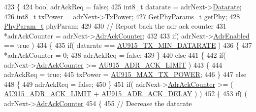 \begin{DoxyCode}
423 \{
424     \textcolor{keywordtype}{bool} adrAckReq = \textcolor{keyword}{false};
425     int8\_t datarate = adrNext->\mbox{\hyperlink{structs_adr_next_params_ae2f6080f3aa0e9485c55513ca56bb24d}{Datarate}};
426     int8\_t txPower = adrNext->\mbox{\hyperlink{structs_adr_next_params_a037b4f849fa8ed4aa1d3c58aef2b28ec}{TxPower}};
427     \mbox{\hyperlink{structs_get_phy_params}{GetPhyParams\_t}} getPhy;
428     \mbox{\hyperlink{unionu_phy_param}{PhyParam\_t}} phyParam;
429 
430     \textcolor{comment}{// Report back the adr ack counter}
431     *adrAckCounter = adrNext->\mbox{\hyperlink{structs_adr_next_params_a24f0356a3491bf07be9ac99ffa33896a}{AdrAckCounter}};
432 
433     \textcolor{keywordflow}{if}( adrNext->\mbox{\hyperlink{structs_adr_next_params_ab3e2fb44577c95786e11aacd56769703}{AdrEnabled}} == \textcolor{keyword}{true} )
434     \{
435         \textcolor{keywordflow}{if}( datarate == \mbox{\hyperlink{group___r_e_g_i_o_n_a_u915_ga3a7bb744191d2b9daaf6637d36d78422}{AU915\_TX\_MIN\_DATARATE}} )
436         \{
437             *adrAckCounter = 0;
438             adrAckReq = \textcolor{keyword}{false};
439         \}
440         \textcolor{keywordflow}{else}
441         \{
442             \textcolor{keywordflow}{if}( adrNext->\mbox{\hyperlink{structs_adr_next_params_a24f0356a3491bf07be9ac99ffa33896a}{AdrAckCounter}} >= \mbox{\hyperlink{group___r_e_g_i_o_n_a_u915_gab5782862067a1d6338da8372a9d484c6}{AU915\_ADR\_ACK\_LIMIT}} )
443             \{
444                 adrAckReq = \textcolor{keyword}{true};
445                 txPower = \mbox{\hyperlink{group___r_e_g_i_o_n_a_u915_ga36808f695e52582b8a6a3ca4b4bf61d4}{AU915\_MAX\_TX\_POWER}};
446             \}
447             \textcolor{keywordflow}{else}
448             \{
449                 adrAckReq = \textcolor{keyword}{false};
450             \}
451             \textcolor{keywordflow}{if}( adrNext->\mbox{\hyperlink{structs_adr_next_params_a24f0356a3491bf07be9ac99ffa33896a}{AdrAckCounter}} >= ( \mbox{\hyperlink{group___r_e_g_i_o_n_a_u915_gab5782862067a1d6338da8372a9d484c6}{AU915\_ADR\_ACK\_LIMIT}} + 
      \mbox{\hyperlink{group___r_e_g_i_o_n_a_u915_ga6c2174a6e83dcd5e4137a28c841d82b2}{AU915\_ADR\_ACK\_DELAY}} ) )
452             \{
453                 \textcolor{keywordflow}{if}( ( adrNext->\mbox{\hyperlink{structs_adr_next_params_a24f0356a3491bf07be9ac99ffa33896a}{AdrAckCounter}} %
454                 \{
455                     \textcolor{comment}{// Decrease the datarate}

\end{DoxyCode}
